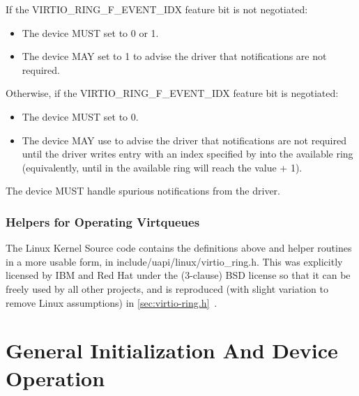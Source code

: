 If the VIRTIO_RING_F_EVENT_IDX feature bit is not negotiated:
\begin{itemize}
\item The device MUST set  to 0 or 1.
\item The device MAY set  to 1 to advise
the driver that notifications are not required.
\end{itemize}

Otherwise, if the VIRTIO_RING_F_EVENT_IDX feature bit is negotiated:
\begin{itemize}
\item The device MUST set  to 0.
\item The device MAY use  to advise the driver that notifications are not required until the driver writes entry with an index specified by  into the available ring (equivalently, until  in the
available ring will reach the value  + 1).
\end{itemize}

The device MUST handle spurious notifications from the driver.

\subsection{Helpers for Operating Virtqueues}\label{sec:Basic Facilities of a Virtio Device / Virtqueues / Helpers for Operating Virtqueues}

The Linux Kernel Source code contains the definitions above and
helper routines in a more usable form, in
include/uapi/linux/virtio_ring.h. This was explicitly licensed by IBM
and Red Hat under the (3-clause) BSD license so that it can be
freely used by all other projects, and is reproduced (with slight
variation to remove Linux assumptions) in \ref{sec:virtio-ring.h}~.

\chapter{General Initialization And Device Operation}\label{sec:General Initialization And Device Operation}

